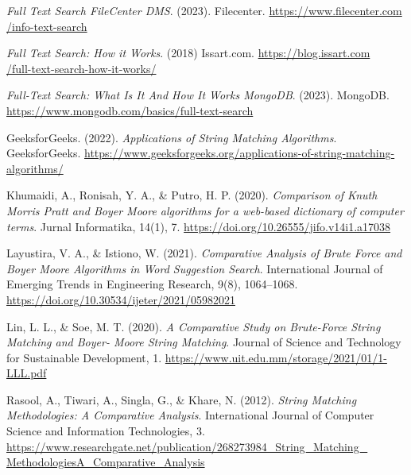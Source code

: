 \begin{thebibliography}{21}
    \emph{Full Text Search \textbar{} FileCenter DMS}. (2023). Filecenter. 
    \href{https://www.filecenter.com/info-text-search.html#:~:text=In\%20a\%20nutshell\%2C\%20full\%20text,merely\%20searching\%20the\%20file\%20nameS}{https://www.filecenter.com\\/info-text-search}

    \emph{Full Text Search: How it Works}. (2018) Issart.com.
    \href{https://blog.issart.com/full-text-search-how-it-works/}{https://blog.issart.com\\/full-text-search-how-it-works/}

    \emph{Full-Text Search: What Is It And How It Works \textbar{} MongoDB}. (2023). MongoDB.
    \href{https://www.mongodb.com/basics/full-text-search}{https://www.mongodb.com/basics/full-text-search}

    GeeksforGeeks. (2022). \emph{Applications of String Matching Algorithms}. GeeksforGeeks.
    \href{https://www.geeksforgeeks.org/applications-of-string-matching-algorithms/}{https://www.geeksforgeeks.org/applications-of-string-matching-algorithms/}

    Khumaidi, A., Ronisah, Y. A., \& Putro, H. P. (2020). \emph{Comparison of Knuth Morris Pratt and
    Boyer Moore algorithms for a web-based dictionary of computer terms}. Jurnal Informatika, 14(1), 7. 
    \href{https://doi.org/10.26555/jifo.v14i1.a17038}{https://doi.org/10.26555/jifo.v14i1.a17038}

    Layustira, V. A., \& Istiono, W. (2021). \emph{Comparative Analysis of Brute Force and Boyer
    Moore Algorithms in Word Suggestion Search}. International Journal of Emerging Trends in
    Engineering Research, 9(8), 1064–1068. 
    \href{https://doi.org/10.30534/ijeter/2021/05982021}{https://doi.org/10.30534/ijeter/2021/05982021}

    Lin, L. L., \& Soe, M. T. (2020). \emph{A Comparative Study on Brute-Force String Matching and
    Boyer- Moore String Matching}. Journal of Science and Technology for Sustainable Development, 1.
    \href{https://www.uit.edu.mm/storage/2021/01/1-LLL.pdf}{https://www.uit.edu.mm/storage/2021/01/1-LLL.pdf}

    Rasool, A., Tiwari, A., Singla, G., \& Khare, N. (2012). \emph{String Matching Methodologies: A
    Comparative Analysis}. International Journal of Computer Science and Information Technologies, 3. 
    \href{https://www.researchgate.net/publication/268273984_String_Matching_MethodologiesA_Comparative_Analysis}{https://www.researchgate.net/publication/268273984\_String\_Matching\_\\MethodologiesA\_Comparative\_Analysis}


\end{thebibliography}
